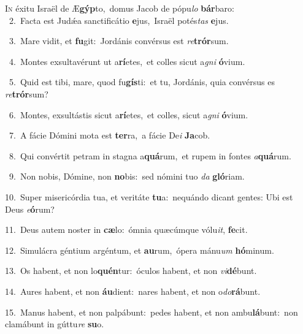 \lettrine{\initial\textcolor{\initialcolor}{I}}{n} éxitu Israël de Æ\-\textbf{gýp}\-to,~\star domus Jacob de pópu\textit{lo} \textbf{bár}\-baro:\\
{\numbfont\textcolor{\numbcolor}{~2.}}~Facta est Judǽa sanctificátio \textbf{e}\-jus,~\star Israël potés\textit{tas} \textbf{e}\-jus.\par
{\numbfont\textcolor{\numbcolor}{~3.}}~Mare vidit, et \textbf{fu}\-git:~\star Jordánis convérsus est \textit{re}\-\textbf{trór}sum.\par
{\numbfont\textcolor{\numbcolor}{~4.}}~Montes exsultavérunt ut a\-\textbf{rí}\-etes,~\star et colles sicut a\textit{gni} \textbf{ó}\-vium.\par
{\numbfont\textcolor{\numbcolor}{~5.}}~Quid est tibi, mare, quod fu\-\textbf{gís}\-ti:~\star et tu, Jordánis, quia convérsus es \textit{re}\-\textbf{trór}sum?\par
{\numbfont\textcolor{\numbcolor}{~6.}}~Montes, exsultástis sicut a\-\textbf{rí}\-etes,~\star et colles, sicut a\textit{gni} \textbf{ó}\-vium.\par
{\numbfont\textcolor{\numbcolor}{~7.}}~A fácie Dómini mota est \textbf{ter}\-ra,~\star a fácie De\textit{i} \textbf{Ja}\-cob.\par
{\numbfont\textcolor{\numbcolor}{~8.}}~Qui convértit petram in stagna a\-\textbf{quá}\-rum,~\star et rupem in fontes \textit{a}\-\textbf{quá}rum.\par
{\numbfont\textcolor{\numbcolor}{~9.}}~Non nobis, Dómine, non \textbf{no}\-bis:~\star sed nómini tuo \textit{da} \textbf{gló}\-riam.\par
{\numbfont\textcolor{\numbcolor}{10.}}~Super misericórdia tua, et veritáte \textbf{tu}\-a:~\star nequándo dicant gentes: Ubi est Deus \textit{e}\-\textbf{ó}rum?\par
{\numbfont\textcolor{\numbcolor}{11.}}~Deus autem noster in \textbf{cæ}\-lo:~\star ómnia quæcúmque vólu\-\textit{it}\-, \textbf{fe}\-cit.\par
{\numbfont\textcolor{\numbcolor}{12.}}~Simulácra géntium argéntum, et \textbf{au}\-rum,~\star ópera mánu\textit{um} \textbf{hó}\-minum.\par
{\numbfont\textcolor{\numbcolor}{13.}}~Os habent, et non lo\-\textbf{quén}\-tur:~\star óculos habent, et non \textit{vi}\-\textbf{dé}bunt.\par
{\numbfont\textcolor{\numbcolor}{14.}}~Aures habent, et non \textbf{áu}\-dient:~\star nares habent, et non o\-\textit{do}\-\textbf{rá}bunt.\par
{\numbfont\textcolor{\numbcolor}{15.}}~Manus habent, et non palpábunt:~\dagger pedes habent, et non ambu\-\textbf{lá}\-bunt:~\star non clamábunt in gúttu\textit{re} \textbf{su}\-o.\par
